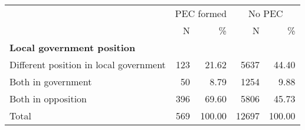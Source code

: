
\begin{tabular}{l|rr|rr}
\hline
& \multicolumn{2}{c|}{PEC formed} & \multicolumn{2}{c}{No PEC} \\
 & N & \% & N & \%\\
\hline
\textbf{Local government position} & \multicolumn{2}{c|}{} & \multicolumn{2}{c}{}\\
\hline
Different position in local government & 123 & 21.62 & 5637 & 44.40\\
\hline
Both in government & 50 & 8.79 & 1254 & 9.88\\
\hline
Both in opposition & 396 & 69.60 & 5806 & 45.73\\
\hline
Total & 569 & 100.00 & 12697 & 100.00 \\
\hline
\end{tabular}
